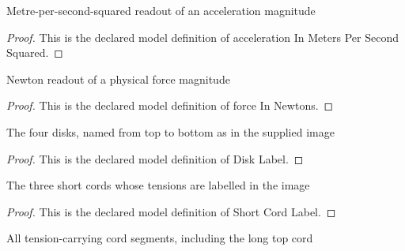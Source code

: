 \begin{definition}
  \label{def:physics:phyx-mini-0757:phyxminiproblems-problemphyxmini0757-accelerationinmeterspersecondsquared}
  Metre-per-second-squared readout of an acceleration magnitude
\end{definition}
\begin{proof}
  This is the declared model definition of acceleration In Meters Per Second Squared.
\end{proof}
\begin{definition}
  \label{def:physics:phyx-mini-0757:phyxminiproblems-problemphyxmini0757-forceinnewtons}
  Newton readout of a physical force magnitude
\end{definition}
\begin{proof}
  This is the declared model definition of force In Newtons.
\end{proof}
\begin{definition}
  \label{def:physics:phyx-mini-0757:phyxminiproblems-problemphyxmini0757-disklabel}
  The four disks, named from top to bottom as in the supplied image
\end{definition}
\begin{proof}
  This is the declared model definition of Disk Label.
\end{proof}
\begin{definition}
  \label{def:physics:phyx-mini-0757:phyxminiproblems-problemphyxmini0757-shortcordlabel}
  The three short cords whose tensions are labelled in the image
\end{definition}
\begin{proof}
  This is the declared model definition of Short Cord Label.
\end{proof}
\begin{definition}
  \label{def:physics:phyx-mini-0757:phyxminiproblems-problemphyxmini0757-cordsegment}
  All tension-carrying cord segments, including the long top cord
\end{definition}
